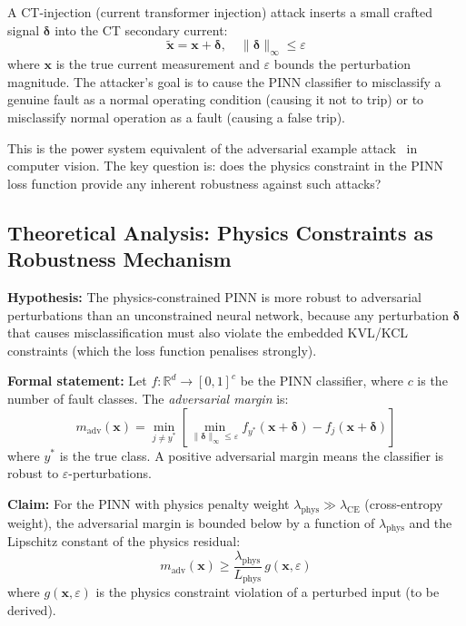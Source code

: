 A CT-injection (current transformer injection) attack inserts a small
crafted signal $\bm{\delta}$ into the CT secondary current:
\begin{equation}
  \tilde{\mathbf{x}} = \mathbf{x} + \bm{\delta}, \quad
  \|\bm{\delta}\|_\infty \leq \varepsilon
  \label{eq:ch12_ct_attack}
\end{equation}
where $\mathbf{x}$ is the true current measurement and $\varepsilon$
bounds the perturbation magnitude. The attacker's goal is to cause
the PINN classifier to misclassify a genuine fault as a normal operating
condition (causing it not to trip) or to misclassify normal operation
as a fault (causing a false trip).

This is the power system equivalent of the adversarial example
attack~\citep{Goodfellow2015} in computer vision. The key question is:
does the physics constraint in the PINN loss function provide any inherent
robustness against such attacks?

\subsection{Theoretical Analysis: Physics Constraints as Robustness Mechanism}

\textbf{Hypothesis:} The physics-constrained PINN is more robust to
adversarial perturbations than an unconstrained neural network, because
any perturbation $\bm{\delta}$ that causes misclassification must also
violate the embedded KVL/KCL constraints (which the loss function penalises
strongly).

\textbf{Formal statement:} Let $f: \mathbb{R}^d \to [0,1]^c$ be the
PINN classifier, where $c$ is the number of fault classes. The
\emph{adversarial margin} is:
\begin{equation}
  m_\mathrm{adv}(\mathbf{x}) = \min_{j \neq y^\ast}
    \left[\min_{\|\bm{\delta}\|_\infty \leq \varepsilon}
    f_{y^\ast}(\mathbf{x} + \bm{\delta}) - f_j(\mathbf{x} + \bm{\delta})\right]
  \label{eq:ch12_adv_margin}
\end{equation}
where $y^\ast$ is the true class. A positive adversarial margin means the
classifier is robust to $\varepsilon$-perturbations.

\textbf{Claim:} For the PINN with physics penalty weight
$\lambda_\mathrm{phys} \gg \lambda_\mathrm{CE}$ (cross-entropy weight),
the adversarial margin is bounded below by a function of
$\lambda_\mathrm{phys}$ and the Lipschitz constant of the physics residual:
\begin{equation}
  m_\mathrm{adv}(\mathbf{x}) \geq \frac{\lambda_\mathrm{phys}}{L_\mathrm{phys}}\,
    g(\mathbf{x}, \varepsilon)
  \label{eq:ch12_margin_bound}
\end{equation}
where $g(\mathbf{x}, \varepsilon)$ is the physics constraint violation
of a perturbed input (to be derived).

